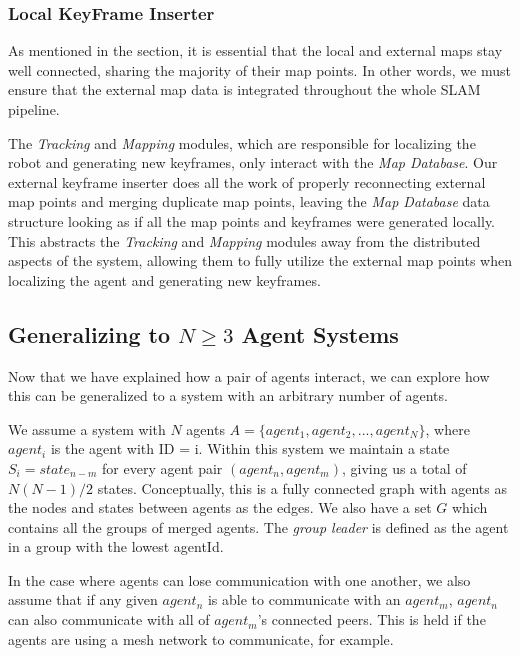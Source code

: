 \subsubsection{Local KeyFrame Inserter}
\label{sec:local-key-frame-inserter}
As mentioned in the  section, it is essential that the local and external maps stay well connected, sharing the majority of their map points. In other words, we must ensure that the external map data is integrated throughout the whole SLAM pipeline.

The \textit{Tracking} and \textit{Mapping} modules, which are responsible for localizing the robot and generating new keyframes, only interact with the \textit{Map Database}. Our external keyframe inserter does all the work of properly reconnecting external map points and merging duplicate map points, leaving the \textit{Map Database} data structure looking as if all the map points and keyframes were generated locally. This abstracts the \textit{Tracking} and \textit{Mapping} modules away from the distributed aspects of the system, allowing them to fully utilize the external map points when localizing the agent and generating new keyframes.

\subsection{Generalizing to $N \geq 3$ Agent Systems}
\label{sec:generalizing-to-n-geq-3-agent-systems}
Now that we have explained how a pair of agents interact, we can explore how this can be generalized to a system with an arbitrary number of agents.

We assume a system with $N$ agents $A=\{agent_1, agent_2, ..., agent_N\}$, where $agent_i$ is the agent with ID = i. Within this system we maintain a state $S_i=state_{n-m}$ for every agent pair $(agent_n, agent_m)$, giving us a total of $N(N-1)/2$ states. Conceptually, this is a fully connected graph with agents as the nodes and states between agents as the edges. We also have a set $G$ which contains all the groups of merged agents. The \textit{group leader} is defined as the agent in a group with the lowest agentId.

In the case where agents can lose communication with one another, we also assume that if any given $agent_n$ is able to communicate with an $agent_m$, $agent_n$ can also communicate with all of $agent_m$'s connected peers. This is held if the agents are using a mesh network to communicate, for example.

